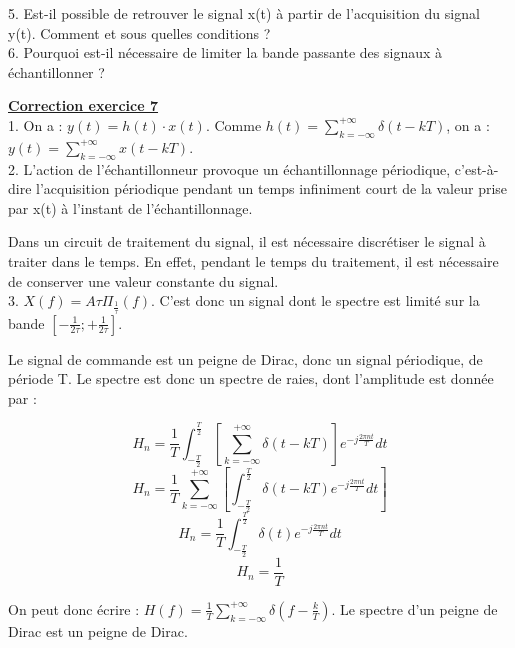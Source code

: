 \documentclass[11pt]{report}
\begin{document}
	5. Est-il possible de retrouver le signal x(t) à partir de l'acquisition du signal y(t). Comment et sous quelles conditions ?\\
	
	6. Pourquoi est-il nécessaire de limiter la bande passante des signaux à échantillonner ?
	
	\vspace{1\baselineskip}
	
	\textbf{\underline{Correction exercice 7}}\\
	
	1. On a : $y(t)=h(t)\cdot x(t)$. Comme $h(t)=\sum_{k=-\infty}^{+\infty}\delta(t-kT)$, on a : $y(t)=\sum_{k=-\infty}^{+\infty}x(t-kT)$.	\\
	
	2. L'action de l'échantillonneur provoque un échantillonnage périodique, c'est-à-dire l'acquisition périodique pendant un temps infiniment court de la valeur prise par x(t) à l'instant de l'échantillonnage.
	
	Dans un circuit de traitement du signal, il est nécessaire discrétiser le signal à traiter dans le temps. En effet, pendant le temps du traitement, il est nécessaire de conserver une valeur constante du signal.\\
	
	3. $X(f) = A\tau \Pi_{\frac{1}{\tau}}(f)$. C'est donc un signal dont le spectre est limité sur la bande $[-\frac{1}{2\tau};+\frac{1}{2\tau}]$.
		
	Le signal de commande est un peigne de Dirac, donc un signal périodique, de période T. Le spectre est donc un spectre de raies, dont l'amplitude est donnée par : 
	
	\begin{equation*}
	H_{n}=\frac{1}{T}\int_{-\frac{T}{2}}^{\frac{T}{2}}[\sum_{k=-\infty}^{+\infty}\delta(t-kT)]e^{-j\frac{2\pi n t}{T}}dt
	\end{equation*}
	\begin{equation*}
	H_{n}=\frac{1}{T}\sum_{k=-\infty}^{+\infty}[\int_{-\frac{T}{2}}^{\frac{T}{2}}\delta(t-kT)e^{-j\frac{2\pi n t}{T}}dt]
	\end{equation*}	
	\begin{equation*}
	H_{n}=\frac{1}{T}\int_{-\frac{T}{2}}^{\frac{T}{2}}\delta(t)e^{-j\frac{2\pi n t}{T}}dt
	\end{equation*}
	\begin{equation*}
	H_{n}=\frac{1}{T}
	\end{equation*}
	
	On peut donc écrire : $H(f)=\frac{1}{T}\sum_{k=-\infty}^{+\infty}\delta(f-\frac{k}{T})$. Le spectre d'un peigne de Dirac est un peigne de Dirac.\\
	
\end{document}

